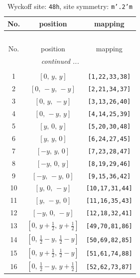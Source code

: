 \documentclass[fleqn,8pt]{jsarticle}
\begin{document}
\begin{longtable}{ccc}
\caption{Wyckoff site: {\tt 48h}, site symmetry: {\tt m'.2'm}}
 \\
 \hline \hline
No. & position & mapping \\ \hline \endfirsthead

\multicolumn{2}{l}{\tablename\ \thetable{}} \\
 \hline \hline
No. & position & mapping \\ \hline \endhead

 \hline \hline
\multicolumn{2}{r}{\footnotesize\it continued ...} \\ \endfoot

 \hline \hline
\multicolumn{2}{r}{} \\ \endlastfoot

1 & $\left[ 0,\, y,\, y \right]$ & {\tt [1,22,33,38]} \\ \hline
2 & $\left[ 0,\, - y,\, - y \right]$ & {\tt [2,21,34,37]} \\ \hline
3 & $\left[ 0,\, y,\, - y \right]$ & {\tt [3,13,26,40]} \\ \hline
4 & $\left[ 0,\, - y,\, y \right]$ & {\tt [4,14,25,39]} \\ \hline
5 & $\left[ y,\, 0,\, y \right]$ & {\tt [5,20,30,48]} \\ \hline
6 & $\left[ y,\, y,\, 0 \right]$ & {\tt [6,24,27,45]} \\ \hline
7 & $\left[ - y,\, y,\, 0 \right]$ & {\tt [7,23,28,47]} \\ \hline
8 & $\left[ - y,\, 0,\, y \right]$ & {\tt [8,19,29,46]} \\ \hline
9 & $\left[ - y,\, - y,\, 0 \right]$ & {\tt [9,15,36,42]} \\ \hline
10 & $\left[ y,\, 0,\, - y \right]$ & {\tt [10,17,31,44]} \\ \hline
11 & $\left[ y,\, - y,\, 0 \right]$ & {\tt [11,16,35,43]} \\ \hline
12 & $\left[ - y,\, 0,\, - y \right]$ & {\tt [12,18,32,41]} \\ \hline
13 & $\left[ 0,\, y + \frac{1}{2},\, y + \frac{1}{2} \right]$ & {\tt [49,70,81,86]} \\ \hline
14 & $\left[ 0,\, \frac{1}{2} - y,\, \frac{1}{2} - y \right]$ & {\tt [50,69,82,85]} \\ \hline
15 & $\left[ 0,\, y + \frac{1}{2},\, \frac{1}{2} - y \right]$ & {\tt [51,61,74,88]} \\ \hline
16 & $\left[ 0,\, \frac{1}{2} - y,\, y + \frac{1}{2} \right]$ & {\tt [52,62,73,87]} \\ \hline

\end{longtable}
\end{document}
